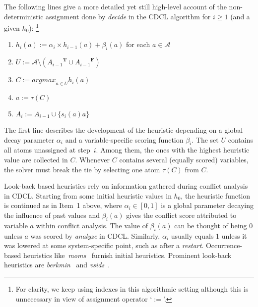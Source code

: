 \documentclass[letterpaper]{article}
\newcommand{\true}{\ensuremath{\boldsymbol{T}}}
\newcommand{\false}{\ensuremath{\boldsymbol{F}}}
\newcommand{\ass}{\ensuremath{A}}
\newcommand{\tlits}[1]{\ensuremath{{#1}^{\true}}}
\newcommand{\flits}[1]{\ensuremath{{#1}^{\false}}}
\begin{document}
The following lines give a more detailed yet still high-level account of the non-deterministic assignment done by
\emph{decide} in the CDCL algorithm for $i\geq 1$ (and a given $h_0$):%
\footnote{\label{fn:ass}For clarity, we keep using indexes in this algorithmic setting although this is
  unnecessary in view of assignment operator `$:=$'.}
\begin{enumerate}\itemindent 10pt
\item $h_i(a) := \alpha_i\times h_{i-1}(a) + \beta_i(a)$ \hfill for each $a\in\mathcal{A}\qquad$
\item $U:=\mathcal{A}\setminus (\tlits{\ass_{i-1}}\cup\flits{\ass_{i-1}})$
\item $C:= \textit{argmax}_{a\in U}h_i(a)$
\item $a:= \tau(C)$
\item $\ass_i := \ass_{i-1}\cup\{s_i(a)a\}$
\end{enumerate}
The first line describes the development of the heuristic depending on a global decay parameter
$\alpha_i$ and a variable-specific scoring function $\beta_i$.
The set $U$ contains all atoms unassigned at step~$i$.
Among them, the ones with the highest heuristic value are collected in $C$.
Whenever $C$ contains several (equally scored) variables,
the solver must break the tie by selecting one atom $\tau(C)$ from $C$.

Look-back based heuristics rely on information gathered during conflict analysis in CDCL.
Starting from some initial heuristic values in $h_0$,
the heuristic function is continued as in Item~1 above,
where
$\alpha_i\in{[0,1]}$ is a global parameter decaying the influence of past values
and
$\beta_i(a)$ gives the conflict score attributed to variable $a$ within conflict analysis.
The value of $\beta_i(a)$ can be thought of being 0 unless $a$ was scored by \textit{analyze} in CDCL.
Similarly, $\alpha_i$ usually equals 1 unless it was lowered at some system-specific point, 
such as after a \emph{restart}.
%
Occurrence-based heuristics like~\textit{moms}~\cite{pretolani96a} furnish initial heuristics.
%
Prominent look-back heuristics are
\textit{berkmin}~\cite{golnov02a}
and
\textit{vsids}~\cite{momazhzhma01a}.
\end{document}
